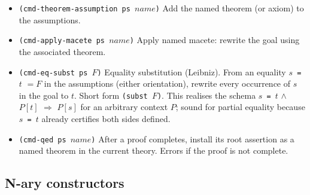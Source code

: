 \begin{itemize}
\item \texttt{(cmd-theorem-assumption ps $\mathit{name}$)}
  Add the named theorem (or axiom) to the assumptions.

\item \texttt{(cmd-apply-macete ps $\mathit{name}$)}
  Apply named macete: rewrite the goal using the associated theorem.

\item \begin{sloppypar}\texttt{(cmd-eq-subst ps $F$)}
  Equality substitution (Leibniz).  From an equality \texttt{$s$ = $t$} $= F$
  in the assumptions (either orientation), rewrite every occurrence of $s$
  in the goal to $t$.  Short form \texttt{(subst $F$)}.  This realises the
  schema \texttt{$s$ = $t$} $\wedge$ \texttt{$P[t]$} $\Rightarrow$
  \texttt{$P[s]$} for an arbitrary context $P$; sound for partial equality
  because \texttt{$s$ = $t$} already certifies both sides
  defined.\end{sloppypar}

\item \texttt{(cmd-qed ps $\mathit{name}$)}
  After a proof completes, install its root assertion as a named theorem
  in the current theory.  Errors if the proof is not complete.

\end{itemize}

\subsection{N-ary constructors}
\label{sec:nary-proof-commands}

